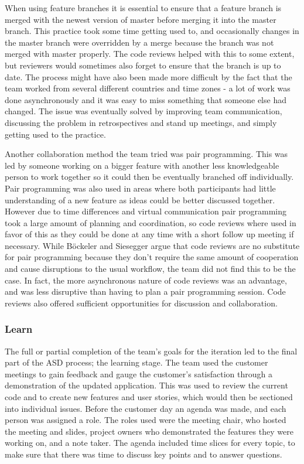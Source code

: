 \documentclass{l3proj}
\begin{document}
When using feature branches it is essential to ensure that a feature branch is merged with the newest version of master before merging it into the master branch. This practice took some time getting used to, and occasionally changes in the master branch were overridden by a merge because the branch was not merged with master properly. The code reviews helped with this to some extent, but reviewers would sometimes also forget to ensure that the branch is up to date. The process might have also been made more difficult by the fact that the team worked from several different countries and time zones - a lot of work was done asynchronously and it was easy to miss something that someone else had changed. The issue was eventually solved by improving team communication, discussing the problem in retrospectives and stand up meetings, and simply getting used to the practice.

Another collaboration method the team tried was pair programming. This was led by someone working on a bigger feature with another less knowledgeable person to work together so it could then be eventually branched off individually. Pair programming was also used in areas where both participants had little understanding of a new feature as ideas could be better discussed together. However due to time differences and virtual communication pair programming took a large amount of planning and coordination, so code reviews where used in favor of this as they could be done at any time with a short follow up meeting if necessary. While Böckeler and Siesegger \cite{codeReviewsPairProg} argue that code reviews are no substitute for pair programming because they don't require the same amount of cooperation and cause disruptions to the usual workflow, the team did not find this to be the case. In fact, the more asynchronous nature of code reviews was an advantage, and was less disruptive than having to plan a pair programming session. Code reviews also offered sufficient opportunities for discussion and collaboration.

\subsubsection{Learn}
\label{learn}
The full or partial completion of the team's goals for the iteration led to the final part of the ASD process; the learning stage. The team used the customer meetings to gain feedback and gauge the customer's satisfaction through a demonstration of the updated application. This was used to review the current code and to create new features and user stories, which would then be sectioned into individual issues. Before the customer day an agenda was made, and each person was assigned a role. The roles used were the meeting chair, who hosted the meeting and slides, project owners who demonstrated the features they were working on, and a note taker. The agenda included time slices for every topic, to make sure that there was time to discuss key points and to answer questions. 
\end{document}
